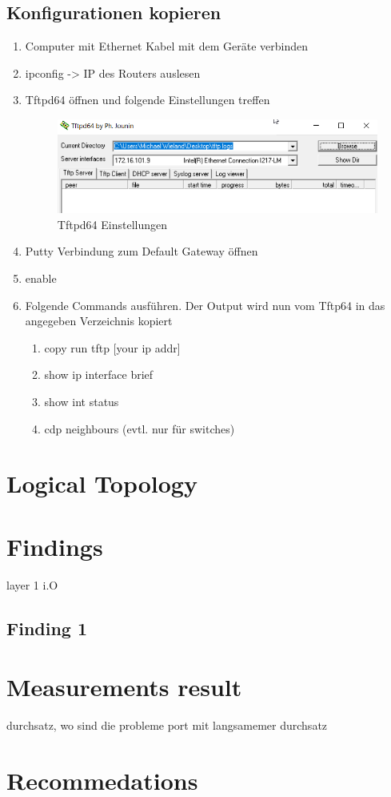 \subsection{Konfigurationen kopieren}
\begin{enumerate}
	\item Computer mit Ethernet Kabel mit dem Geräte verbinden
	\item ipconfig -> IP des Routers auslesen
	\item Tftpd64 öffnen und folgende Einstellungen treffen
	\begin{figure}[h]
		\centering
		\includegraphics[width=0.7\linewidth]{images/tftpd64_configuration}
		\caption{Tftpd64 Einstellungen}
		\label{fig:tftpd64configuration}
	\end{figure}
	\item Putty Verbindung zum Default Gateway öffnen
	\item enable
	\item Folgende Commands ausführen. Der Output wird nun vom Tftp64 in das angegeben Verzeichnis kopiert
	\begin{enumerate}
		\item copy run tftp [your ip addr]
		\item show ip interface brief
		\item show int status
		\item cdp neighbours (evtl. nur für switches)
	\end{enumerate}
	\itme 
\end{enumerate}

\section{Logical Topology}



\section{Findings}
layer 1 i.O
\subsection{Finding 1}

\section{Measurements result}
durchsatz, wo sind die probleme
port mit langsamemer durchsatz

\section{Recommedations}

\section{}


